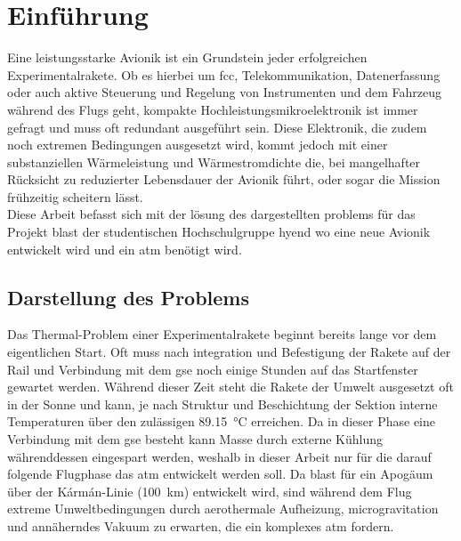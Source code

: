 \chapter{Einführung}			
\label{sec:Introduction}


Eine leistungsstarke Avionik ist ein Grundstein jeder erfolgreichen Experimentalrakete. Ob es hierbei um \ac{fcc},
Telekommunikation, Datenerfassung oder auch aktive Steuerung und Regelung von
Instrumenten und dem Fahrzeug während des Flugs geht, kompakte Hochleistungsmikroelektronik ist immer gefragt und muss oft redundant ausgeführt sein.
Diese Elektronik, die zudem noch extremen Bedingungen ausgesetzt wird, kommt jedoch mit einer
substanziellen Wärmeleistung und Wärmestromdichte die, bei mangelhafter Rücksicht zu reduzierter Lebensdauer der Avionik führt,
oder sogar die Mission frühzeitig scheitern lässt.\\

Diese Arbeit befasst sich mit der lösung des dargestellten problems für das Projekt \ac{blast} der studentischen Hochschulgruppe \ac{hyend}
wo eine neue Avionik entwickelt wird und ein \ac{atm} benötigt wird.

\section{Darstellung des Problems}

Das Thermal-Problem einer Experimentalrakete beginnt bereits lange vor dem eigentlichen Start. Oft muss nach integration und
Befestigung der Rakete auf der Rail und Verbindung mit dem \ac{gse} noch einige Stunden auf das Startfenster gewartet werden.
Während dieser Zeit steht die Rakete der Umwelt ausgesetzt oft in der Sonne und kann, je nach Struktur und Beschichtung der Sektion 
interne Temperaturen über den zulässigen \SI{89.15}{\degreeCelsius} erreichen. Da in dieser Phase eine Verbindung mit dem 
\ac{gse} besteht kann Masse durch externe Kühlung währenddessen eingespart werden, weshalb in dieser Arbeit nur für die darauf folgende 
Flugphase das \ac{atm} entwickelt werden soll.
Da \ac{blast} für ein Apogäum über der Kármán-Linie (\SI{100}{\kilo\meter}) entwickelt wird, sind während dem Flug extreme Umweltbedingungen
durch aerothermale Aufheizung, microgravitation und annäherndes Vakuum zu erwarten, die ein komplexes \ac{atm} fordern.\\

